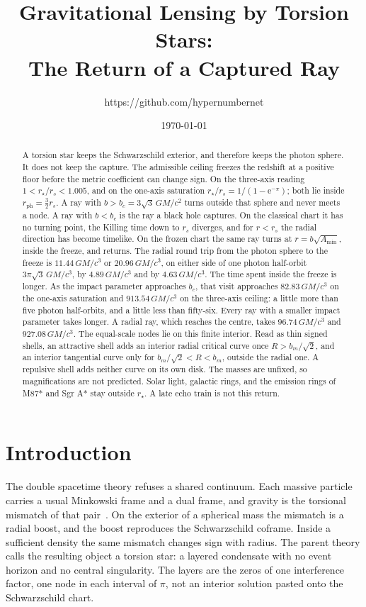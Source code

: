 \documentclass[a4paper]{article}
\title{Gravitational Lensing by Torsion Stars:\\
The Return of a Captured Ray}
\author{https://github.com/hypernumbernet}
\date{\today}
\begin{document}
\maketitle

\begin{abstract}
A torsion star keeps the Schwarzschild exterior, and therefore keeps the photon sphere. It does not keep the capture. The admissible ceiling freezes the redshift at a positive floor before the metric coefficient can change sign. On the three-axis reading \(1<r_\star/r_s<1.005\), and on the one-axis saturation \(r_\star/r_s=1/(1-\mathrm{e}^{-\pi})\); both lie inside \(r_{\mathrm{ph}}=\frac32 r_s\). A ray with \(b>b_c=3\sqrt{3}\,GM/c^2\) turns outside that sphere and never meets a node. A ray with \(b<b_c\) is the ray a black hole captures. On the classical chart it has no turning point, the Killing time down to \(r_s\) diverges, and for \(r<r_s\) the radial direction has become timelike. On the frozen chart the same ray turns at \(r=b\sqrt{A_{\min}}\), inside the freeze, and returns. The radial round trip from the photon sphere to the freeze is \(11.44\,GM/c^3\) or \(20.96\,GM/c^3\), on either side of one photon half-orbit \(3\pi\sqrt{3}\,GM/c^3\), by \(4.89\,GM/c^3\) and by \(4.63\,GM/c^3\). The time spent inside the freeze is longer. As the impact parameter approaches \(b_c\), that visit approaches \(82.83\,GM/c^3\) on the one-axis saturation and \(913.54\,GM/c^3\) on the three-axis ceiling: a little more than five photon half-orbits, and a little less than fifty-six. Every ray with a smaller impact parameter takes longer. A radial ray, which reaches the centre, takes \(96.74\,GM/c^3\) and \(927.08\,GM/c^3\). The equal-scale nodes lie on this finite interior. Read as thin signed shells, an attractive shell adds an interior radial critical curve once \(R>b_m/\sqrt{2}\), and an interior tangential curve only for \(b_m/\sqrt{2}<R<b_m\), outside the radial one. A repulsive shell adds neither curve on its own disk. The masses are unfixed, so magnifications are not predicted. Solar light, galactic rings, and the emission rings of M87* and Sgr A* stay outside \(r_\star\). A late echo train is not this return.
\end{abstract}

\section{Introduction}
\label{sec:introduction}

The double spacetime theory refuses a shared continuum. Each massive particle carries a usual Minkowski frame and a dual frame, and gravity is the torsional mismatch of that pair~\cite{dst-main}. On the exterior of a spherical mass the mismatch is a radial boost, and the boost reproduces the Schwarzschild coframe. Inside a sufficient density the same mismatch changes sign with radius. The parent theory calls the resulting object a torsion star: a layered condensate with no event horizon and no central singularity. The layers are the zeros of one interference factor, one node in each interval of \(\pi\), not an interior solution pasted onto the Schwarzschild chart.
\end{document}

